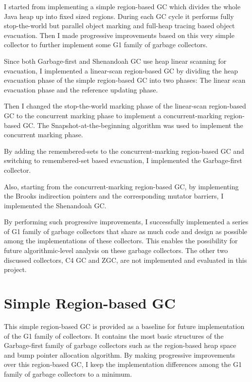 I started from implementing a simple region-based GC which divides the whole Java heap
up into fixed sized regions. During each GC cycle it performs fully stop-the-world but parallel object marking
and full-heap tracing based object evacuation.
Then I made progressive improvements based on this very simple collector to further implement some G1 family of garbage collectors.

Since both Garbage-first and Shenandoah GC use heap linear scanning for evacuation,
I implemented a linear-scan region-based GC by dividing the heap evacuation phase
of the simple region-based GC into two phases: The linear scan evacuation phase
and the reference updating phase.

Then I changed the stop-the-world marking phase of the linear-scan region-based GC
to the concurrent marking phase to implement a concurrent-marking region-based GC.
The Snapshot-at-the-beginning algorithm \citep{yuasa1990real} was used to implement the concurrent marking phase.

By adding the remembered-sets to the concurrent-marking region-based GC
and switching to remembered-set based evacuation,
I implemented the Garbage-first collector.

Also, starting from the concurrent-marking region-based GC, by implementing the Brooks indirection pointers
and the corresponding mutator barriers, I implemented the Shenandoah GC.

By performing such progressive improvements, I successfully implemented a series of
G1 family of garbage collectors that share as much code and design as possible
among the implementations of these collectors. This enables the possibility for future
algorithmic-level analysis on these garbage collectors. The other two discussed
collectors, C4 GC and ZGC, are not implemented and evaluated in this project.

\section{Simple Region-based GC}
\label{sec:simpleregiongc}

This simple region-based GC is provided as a baseline for future implementation of the G1 family of collectors.
It contains the most basic structures of the Garbage-first family of garbage collectors such as
the region-based heap space and bump pointer allocation algorithm. By making progressive improvements
over this region-based GC, I keep the implementation differences among the
G1 family of garbage collectors to a minimum.

